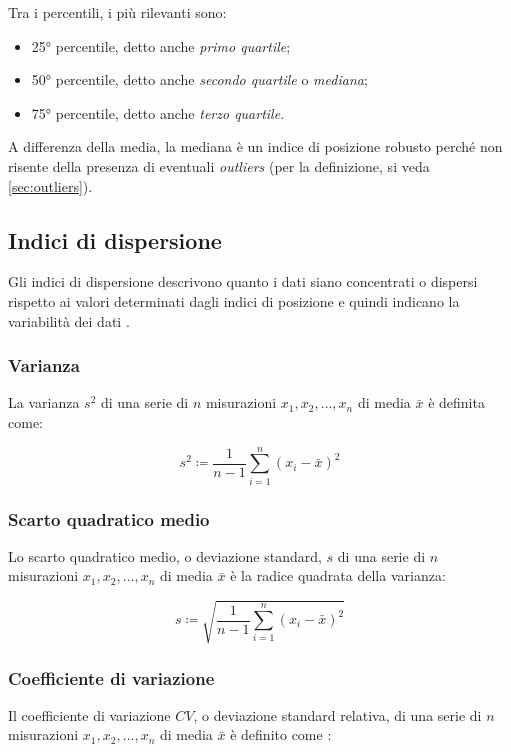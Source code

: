 Tra i percentili, i più rilevanti sono:
\begin{itemize}
	\item 25° percentile, detto anche \textit{primo quartile};
	\item 50° percentile, detto anche \textit{secondo quartile} o \textit{mediana};
	\item 75° percentile, detto anche \textit{terzo quartile}.
\end{itemize}

A differenza della media, la mediana è un indice di posizione robusto perché non risente della presenza di eventuali \textit{outliers} \cite{book} (per la definizione, si veda \autoref{sec:outliers}).

\subsection{Indici di dispersione}
Gli indici di dispersione descrivono quanto i dati siano concentrati o dispersi rispetto ai valori determinati dagli indici di posizione e quindi indicano la variabilità dei dati \cite{ross2008probabilita}.
\subsubsection{Varianza}
La varianza $s^{2}$ di una serie di $n$ misurazioni $x_{1}, x_{2},\dots, x_{n}$ di media $\bar{x}$ è definita come:

\begin{equation}
s^{2}\coloneqq\frac{1}{n-1}\sum_{i=1}^{n}(x_{i}-\bar{x})^{2}
\end{equation}

\subsubsection{Scarto quadratico medio}
Lo scarto quadratico medio, o deviazione standard, $s$ di una serie di $n$ misurazioni $x_{1}, x_{2},\dots, x_{n}$ di media $\bar{x}$ è la radice quadrata della varianza:

\begin{equation}
s\coloneqq\sqrt{\frac{1}{n-1}\sum_{i=1}^{n}(x_{i}-\bar{x})^{2}}
\end{equation}

\subsubsection{Coefficiente di variazione}
Il coefficiente di variazione $CV$, o deviazione standard relativa, di una serie di $n$ misurazioni $x_{1}, x_{2},\dots, x_{n}$ di media $\bar{x}$ è definito come \cite{brown2002statistics}:

